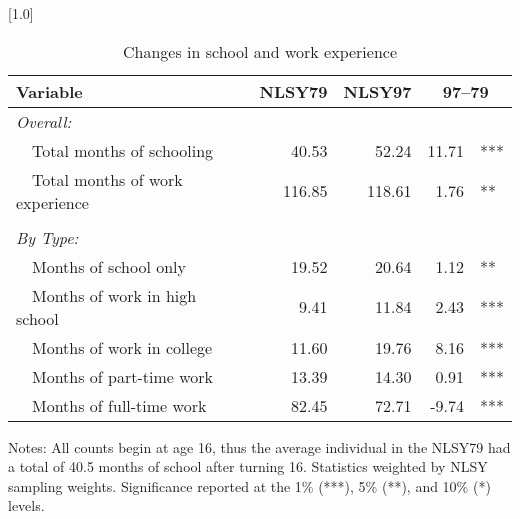 \begin{table}[ht]
\caption{Changes in school and work experience}\label{tab:exp}
\centering
\scalebox{1.0}[1.0]{%
\begin{threeparttable}
\begin{tabular}{lrrr@{}l}
\toprule 
Variable & NLSY79 & NLSY97 & \multicolumn{2}{c}{97--79} \\
\midrule 
\multicolumn{5}{l}{\emph{Overall:}}                                               \\
~~Total months of schooling        & 40.53 & 52.24 & 11.71 & *** \\
~~Total months of work experience  & 116.85 & 118.61 & 1.76 & ** \\
\vspace{-6pt}                                                                         \\ 
\multicolumn{5}{l}{\emph{By Type:}}                                               \\
~~Months of school only            & 19.52 & 20.64 & 1.12 & ** \\
~~Months of work in high school    & 9.41 & 11.84 & 2.43 & *** \\
~~Months of work in college        & 11.60 & 19.76 & 8.16 & *** \\
~~Months of part-time work         & 13.39 & 14.30 & 0.91 & *** \\
~~Months of full-time work         & 82.45 & 72.71 & -9.74 & *** \\
\bottomrule 
\end{tabular} 
\footnotesize{Notes: All counts begin at age 16, thus the average individual in the NLSY79 had a total of 40.5 months of school after turning 16. Statistics weighted by NLSY sampling weights. Significance reported at the 1\% (***), 5\% (**), and 10\% (*) levels.}
\end{threeparttable} 
} 
\end{table} 

